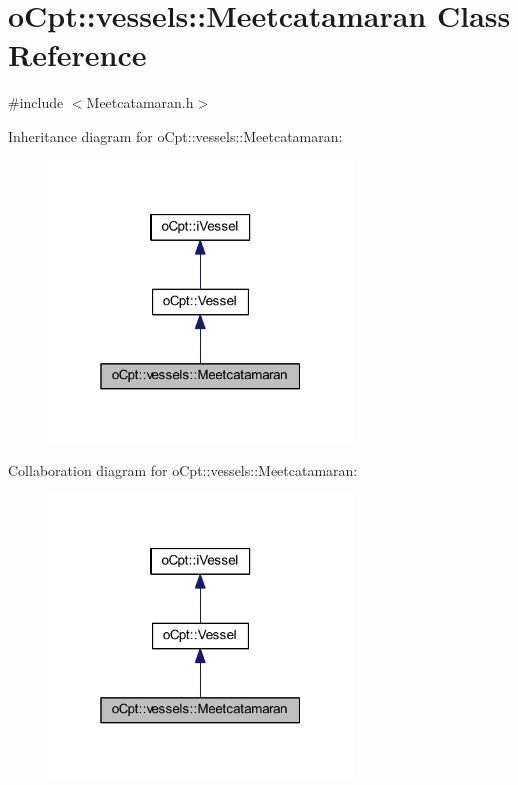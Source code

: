 \hypertarget{classo_cpt_1_1vessels_1_1_meetcatamaran}{}\section{o\+Cpt\+:\+:vessels\+:\+:Meetcatamaran Class Reference}
\label{classo_cpt_1_1vessels_1_1_meetcatamaran}


{\ttfamily \#include $<$Meetcatamaran.\+h$>$}



Inheritance diagram for o\+Cpt\+:\+:vessels\+:\+:Meetcatamaran\+:
\nopagebreak
\begin{figure}[H]
\begin{center}
\leavevmode
\includegraphics[width=229pt]{classo_cpt_1_1vessels_1_1_meetcatamaran__inherit__graph}
\end{center}
\end{figure}


Collaboration diagram for o\+Cpt\+:\+:vessels\+:\+:Meetcatamaran\+:
\nopagebreak
\begin{figure}[H]
\begin{center}
\leavevmode
\includegraphics[width=229pt]{classo_cpt_1_1vessels_1_1_meetcatamaran__coll__graph}
\end{center}
\end{figure}
